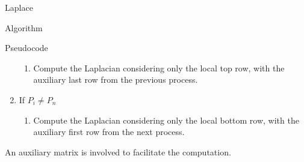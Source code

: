 \begin{chapter}{Laplace}
\begin{section}{Algorithm}
\begin{subsection}{Pseudocode}
\begin{enumerate}
                \begin{enumerate}
                    \item Compute the Laplacian considering only the local top row, with the auxiliary last row from the previous process.
                \end{enumerate}
                \item If $P_i \neq P_n$
                \begin{enumerate}
                    \item Compute the Laplacian considering only the local bottom row, with the auxiliary first row from the next process.
                \end{enumerate}
            \end{enumerate}
            An auxiliary matrix is involved to facilitate the computation.
            
        \end{subsection}
    \end{section}
\end{chapter}